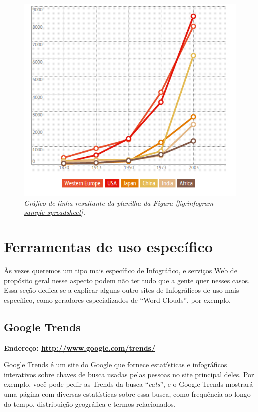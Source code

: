 \documentclass[12pt,onecolumn]{article}
\begin{document}
    \begin{figure}[ht]
      \centering
      \includegraphics[width=.9\linewidth]{infogram-sample-chart.png}
      \caption{
        \footnotesize
        \it
        Gráfico de linha resultante da planilha da Figura
        \ref{fig:infogram-sample-spreadsheet}.
      }
      \label{fig:infogram-sample-chart}
    \end{figure}

\clearpage
\section{Ferramentas de uso específico}
  Às vezes queremos um tipo mais específico de Infográfico, e serviços Web de
  propósito geral nesse aspecto podem não ter tudo que a gente quer nesses
  casos. Essa seção dedica-se a explicar alguns outro sites de Infográficos de
  uso mais específico, como geradores especializados de ``Word Clouds'', por
  exemplo.

  \subsection{Google Trends}
    \textbf{Endereço: \url{http://www.google.com/trends/}}
    
    Google Trends é um site do Google que fornece estatísticas e infográficos
    interativos sobre chaves de busca usadas pelas pessoas no site principal
    deles. Por exemplo, você pode pedir as Trends da busca ``\textit{cats}'', e
    o Google Trends mostrará uma página com diversas estatísticas sobre essa
    busca, como frequência ao longo do tempo, distribuição geográfica e termos
    relacionados.
    
\end{document}
